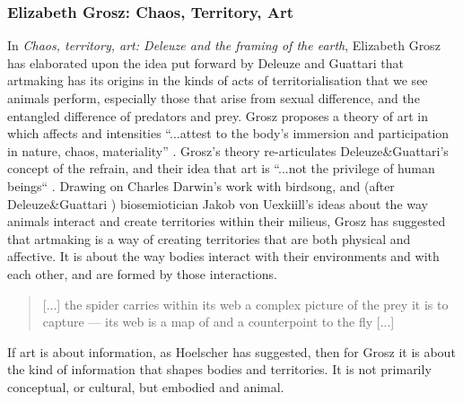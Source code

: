         \subsubsection{Elizabeth Grosz: Chaos, Territory, Art} \label{sec:ElizibethGroszChaosTerritoryArt} 

            In \emph{Chaos, territory, art: Deleuze and the framing of the earth}, Elizabeth Grosz has elaborated upon the idea put forward by Deleuze and Guattari that artmaking has its origins in the kinds of acts of territorialisation that we see animals perform, especially those that arise from sexual difference, and the entangled difference of predators and prey. Grosz proposes a theory of art in which affects and intensities “...attest to the body's immersion and participation in nature, chaos, materiality” \citep[p.3]{GroszChaosTerritoryArt2008}. Grosz's theory re-articulates Deleuze\&Guattari's concept of the refrain, and their idea that art is “...not the privilege of human beings“ \citep[p.316]{DeleuzeGuattariAThousandPlateaus1987}. Drawing on Charles Darwin's work with birdsong, and (after Deleuze\&Guattari \citep[p.314]{DeleuzeGuattariAThousandPlateaus1987}) biosemiotician Jakob von Uexkiill's ideas about the way animals interact and create territories within their milieus, Grosz has suggested that artmaking is a way of creating territories that are both physical and affective. It is about the way bodies interact with their environments and with each other, and are formed by those interactions.

            \begin{quote}
                [...] the spider carries within its web a complex picture of the prey it is to capture — its web is a map of and a counterpoint to the fly [...] \citep[p.22]{GroszChaosTerritoryArt2008}
            \end{quote}

            If art is about information, as Hoelscher has suggested, then for Grosz it is about the kind of information that shapes bodies and territories. It is not primarily conceptual, or cultural, but embodied and animal.

